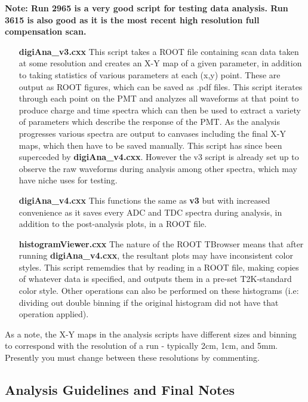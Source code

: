 \documentclass[twoside,letterpaper]{refart}
\begin{document}
\textbf{Note:  Run 2965 is a very good script for testing data analysis. Run 3615 is also good as it is the most recent high resolution full compensation scan.}

\begin{enumerate}
	
	\item [\textbf{digiAna\_v3.cxx}] This script takes a ROOT file containing scan data taken at some resolution and creates an X-Y map of a given parameter, in addition to taking statistics of various parameters at each (x,y) point. These are output as ROOT figures, which can be saved as .pdf files. This script iterates through each point on the PMT and analyzes all waveforms at that point to produce charge and time spectra which can then be used to extract a variety of parameters which describe the response of the PMT. As the analysis progresses various spectra are output to canvases including the final X-Y maps, which then have to be saved manually. This script has since been superceded by \textbf{digiAna\_v4.cxx}. However the v3 script is already set up to observe the raw waveforms during analysis among other spectra, which may have niche uses for testing.

	\item [\textbf{digiAna\_v4.cxx}] This functions the same as \textbf{v3} but with increased convenience as it saves every ADC and TDC spectra during analysis, in addition to the post-analysis plots, in a ROOT file.

	\item [\textbf{histogramViewer.cxx}] The nature of the ROOT TBrowser means that after running \textbf{digiAna\_v4.cxx}, the resultant plots may have inconsistent color styles. This script rememdies that by reading in a ROOT file, making copies of whatever data is specified, and outputs them in a pre-set T2K-standard color style. Other operations can also be performed on these histograms (i.e: dividing out double binning if the original histogram did not have that operation applied). 

\end{enumerate}

As a note, the X-Y maps in the analysis scripts have different sizes and binning to correspond with the resolution of a run - typically 2cm, 1cm, and 5mm. Presently you must change between these resolutions by commenting.

\clearpage
\subsection{Analysis Guidelines and Final Notes}
\end{document}

